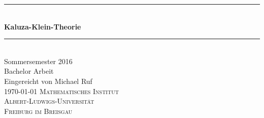 \newcommand{\HRule}{\rule{\linewidth}{0.5mm}}
\begin{titlepage}
\begin{center}
  \HRule \\[0.4cm]
  { \huge \bfseries Kaluza-Klein-Theorie}\\
  \HRule \\[0.5cm]
  \large Sommersemester 2016 \\[0.5cm]  
  Bachelor Arbeit\\
  Eingereicht von Michael Ruf\\[1.5cm]
  \today
  \vfill
  \normalsize
  \textsc{Mathematisches Institut} \\
  \textsc{Albert-Ludwigs-Universität} \\
  \textsc{Freiburg im Breisgau}
\end{center}
\end{titlepage}
